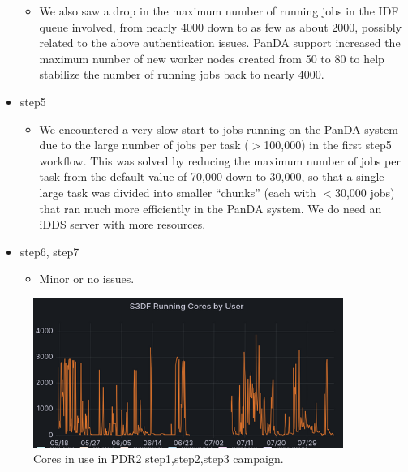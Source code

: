 \begin{itemize}
\begin{itemize}
  \item
  We also saw a drop in the maximum number of running jobs in the IDF queue involved, from nearly 4000 down to as few as about 2000, possibly related to the above authentication issues.
  PanDA support increased the maximum number of new worker nodes created from
50 to 80 to help stabilize the number of running jobs back to nearly 4000.


\end{itemize} %

\item step5
\begin{itemize}

  \item
  We encountered a very slow start to jobs running on the PanDA system due to the large number of jobs per task ($>$100,000) in the first step5 workflow.
  This was solved by reducing the maximum number of jobs per task from the default value of 70,000 down to 30,000, so that a single large task was divided into smaller ``chunks'' (each with $<$30,000 jobs) that ran much more efficiently in the PanDA system.
We do need an  iDDS server with more resources.

\end{itemize} %

\item step6, step7
\begin{itemize}

  \item Minor or no issues.

\end{itemize} %

\end{itemize} %

 \begin{figure}
 \includegraphics[width=0.9\textwidth]{Campcorespdr2.png}
         \caption{Cores in use in PDR2 step1,step2,step3 campaign.}  \label{fig:campaigncores}
 \end{figure}



